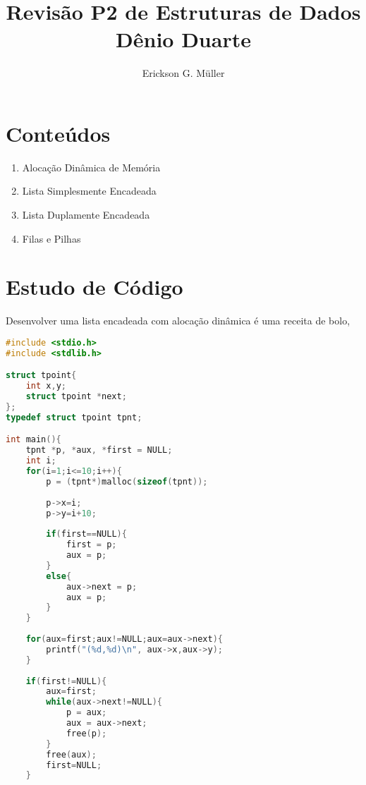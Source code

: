 \documentclass[ ]{article}
\title{Revisão P2 de Estruturas de Dados \\ Dênio Duarte}
\author{Erickson G. Müller}
\begin{document}
\maketitle

\section{Conteúdos}
\begin{enumerate}
	\item Alocação Dinâmica de Memória
	\item Lista Simplesmente Encadeada
	\item Lista Duplamente Encadeada
	\item Filas e Pilhas
\end{enumerate}
\pagebreak
\section{Estudo de Código}
	Desenvolver uma lista encadeada com alocação dinâmica é uma receita de bolo, 
	
	\begin{lstlisting}[language = C]
#include <stdio.h>
#include <stdlib.h>

struct tpoint{
	int x,y;
	struct tpoint *next;
};
typedef struct tpoint tpnt;

int main(){
	tpnt *p, *aux, *first = NULL;
	int i;
	for(i=1;i<=10;i++){
		p = (tpnt*)malloc(sizeof(tpnt));
		
		p->x=i;
		p->y=i+10;
		
		if(first==NULL){
			first = p;
			aux = p;
		}
		else{
			aux->next = p;
			aux = p;
		}
	}
	
	for(aux=first;aux!=NULL;aux=aux->next){
		printf("(%d,%d)\n", aux->x,aux->y);
	}
	
	if(first!=NULL){
		aux=first;
		while(aux->next!=NULL){
			p = aux;
			aux = aux->next;
			free(p);
		}
		free(aux);
		first=NULL;
	}
	\end{lstlisting}
\end{document}
